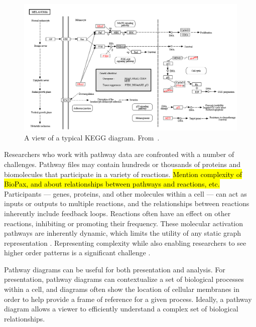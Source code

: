 \begin{figure}[htb]
  \centering
  \includegraphics[width=\linewidth]{figures/kegg2}
  \caption{\label{fig:kvik} A view of a typical KEGG diagram. From~\cite{Fjukstad2014kvik}.}
\end{figure}


Researchers who work with pathway data are confronted with a number of challenges.
Pathway files may contain hundreds or thousands of proteins and biomolecules that participate in a variety of reactions.
\hl{Mention complexity of BioPax, and about relationships between pathways and reactions, etc.}
Participants --- genes, proteins, and other molecules within a cell --- can act as inputs or outputs to multiple reactions, and the relationships between reactions inherently include feedback loops.
Reactions often have an effect on other reactions, inhibiting or promoting their frequency.
These molecular activation pathways are inherently dynamic, which limits the utility of any static graph representation \cite{kitano2002systems}.
Representing complexity while also enabling researchers to see higher order patterns is a significant challenge \cite{saraiya2005visualizing}.


Pathway diagrams can be useful for both presentation and analysis.
For presentation, pathway diagrams can contextualize a set of biological processes within a cell, and diagrams often show the location of cellular membranes in order to help provide a frame of reference for a given process.
Ideally, a pathway diagram allows a viewer to efficiently understand a complex set of biological relationships.


